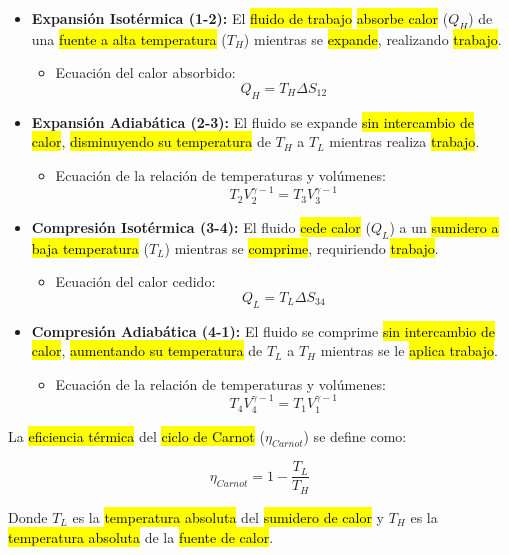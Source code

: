 \documentclass{article}
\begin{document}
\begin{itemize}
    \item \textbf{Expansión Isotérmica (1-2):} El \hl{fluido de trabajo} \hl{absorbe calor} ($Q_H$) de una \hl{fuente a alta temperatura} ($T_H$) mientras se \hl{expande}, realizando \hl{trabajo}.
    \begin{itemize}
        \item Ecuación del calor absorbido:
        $$
        	Q_H = T_H \Delta S_{12}
        $$
    \end{itemize}

    \item \textbf{Expansión Adiabática (2-3):} El fluido se expande \hl{sin intercambio de calor}, \hl{disminuyendo su temperatura} de $T_H$ a $T_L$ mientras realiza \hl{trabajo}.
    \begin{itemize}
        \item Ecuación de la relación de temperaturas y volúmenes:
        $$
        	T_2 V_2^{\gamma-1} = T_3 V_3^{\gamma-1}
        $$
    \end{itemize}

    \item \textbf{Compresión Isotérmica (3-4):} El fluido \hl{cede calor} ($Q_L$) a un \hl{sumidero a baja temperatura} ($T_L$) mientras se \hl{comprime}, requiriendo \hl{trabajo}.
    \begin{itemize}
        \item Ecuación del calor cedido:
        $$
        	Q_L = T_L \Delta S_{34}
        $$
    \end{itemize}

    \item \textbf{Compresión Adiabática (4-1):} El fluido se comprime \hl{sin intercambio de calor}, \hl{aumentando su temperatura} de $T_L$ a $T_H$ mientras se le \hl{aplica trabajo}.
    \begin{itemize}
        \item Ecuación de la relación de temperaturas y volúmenes:
        $$
        	T_4 V_4^{\gamma-1} = T_1 V_1^{\gamma-1}
        $$
    \end{itemize}
\end{itemize}

La \hl{eficiencia térmica} del \hl{ciclo de Carnot} ($\eta_{Carnot}$) se define como:

$$
	\eta_{Carnot} = 1 - \frac{T_L}{T_H}
$$

Donde $T_L$ es la \hl{temperatura absoluta} del \hl{sumidero de calor} y $T_H$ es la \hl{temperatura absoluta} de la \hl{fuente de calor}.
\end{document}
